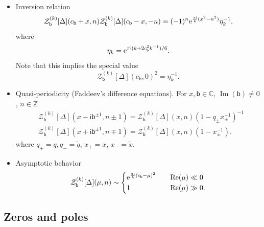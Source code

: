 \documentclass[a4paper,11pt]{article}	%
\DeclareMathOperator{\real}{Re}
\DeclareMathOperator{\imag}{Im}
\def\mc{\mathcal}
\def\ms{\mathsf}
\def\IC{\mathbb{C}}
\def\IZ{\mathbb{Z}}
\def\tq{\tilde{q}}
\def\tx{\tilde{x}}
\newcommand{\re}{{\rm e}}
\newcommand{\ri}{{\mathsf{i}}}
\newcommand{\bb}{\ms{b}}
\begin{document}
\begin{itemize}
\item Inversion relation
  \begin{equation}
    \mc{Z}^{(k)}_\bb[\Delta](c_\bb+x,n)
    \mc{Z}^{(k)}_\bb[\Delta](c_\bb-x,-n) = (-1)^n
    \re^{\frac{\pi\ri}{k}(x^2-n^2)}\eta_k^{-1},
  \end{equation}
  where
  \begin{equation}
    \eta_k = \re^{\pi\ri(k+2c_{\bb}^2 k^{-1})/6}.
  \end{equation}
  Note that this implies the special value
  \begin{equation}
    \mc{Z}^{(k)}_\bb[\Delta](c_\bb,0)^2 = \eta_k^{-1}.
  \end{equation}
\item Quasi-periodicity (Faddeev's difference equations).  For
  $x,\bb\in \IC$, $\imag(\bb) \neq 0$, $n\in\IZ$
  \begin{equation}
    \begin{aligned}
      &\mc{Z}^{(k)}_\bb[\Delta]\left(x-\ri\bb^{\pm 1},n\pm 1\right)
      =\mc{Z}^{(k)}_\bb[\Delta](x,n)
      \left(1-q_{\pm}x_{\pm}^{-1}\right)^{-1}\\
      &\mc{Z}^{(k)}_\bb[\Delta]\left(x+\ri\bb^{\pm 1},n\mp 1\right)
      =\mc{Z}^{(k)}_\bb[\Delta](x,n) \left(1-x_{\pm}^{-1}\right).
    \end{aligned}
    \label{eq:Db-per}
  \end{equation}
  where $q_+ = q, q_- = \tq$, $x_+ = x$, $x_- = \tx$.
\item Asymptotic behavior
  \begin{align}
    \mc{Z}_\bb^{(k)}[\Delta](\mu,n) \sim
    \begin{cases}
      \re^{\frac{\pi\ri}{k}(c_\bb-\mu)^2}\quad &\real(\mu) \ll 0\\
      1 \quad &\real(\mu) \gg 0.
    \end{cases}
                \label{eq:Zasymp}
  \end{align}
\end{itemize}

\subsection{Zeros and poles}
\end{document}
